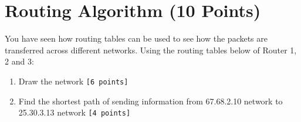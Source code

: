 \documentclass{WeSTassignment}
\begin{document}

\section{Routing Algorithm (10 Points)}
You have seen how routing tables can be used to see how the packets are transferred across different networks. Using the routing tables below of Router 1, 2 and 3:
\begin{enumerate}
\item Draw the network \texttt{[6 points]}
\item Find the shortest path of sending information from 67.68.2.10 network to 25.30.3.13 network \texttt{[4 points]}
\end{enumerate}
\end{document}
